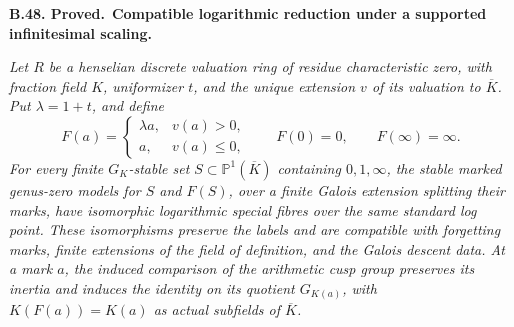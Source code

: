 \documentclass[11pt,a4paper]{article}
\newenvironment{claim}[3]{\par\medskip\noindent\hypertarget{#1}{\textbf{#1. #2.}}\ \textbf{#3.}\par\nopagebreak\smallskip\begingroup\itshape}{\endgroup\par\smallskip}
\begin{document}
\begin{claim}{B.48}{Proved}{Compatible logarithmic reduction under a supported infinitesimal scaling}
Let \(R\) be a henselian discrete valuation ring of residue
characteristic zero, with fraction field \(K\), uniformizer \(t\),
and the unique extension \(v\) of its valuation to \(\overline K\).
Put \(\lambda=1+t\), and define
\[
 F(a)=
 \begin{cases}
   \lambda a,&v(a)>0,\\
   a,&v(a)\leq0,
 \end{cases}
 \qquad F(0)=0,
 \qquad F(\infty)=\infty.                                \tag{B.CF.12}
\]
For every finite \(G_K\)-stable set \(S\subset\mathbb P^1(\overline K)\)
containing \(0,1,\infty\), the stable marked genus-zero models for
\(S\) and \(F(S)\), over a finite Galois extension splitting their
marks, have isomorphic logarithmic special fibres over the same
standard log point. These isomorphisms preserve the labels and are
compatible with forgetting marks, finite extensions of the field of
definition, and the Galois descent data. At a mark \(a\), the induced
comparison of the arithmetic cusp group preserves its inertia and
induces the identity on its quotient \(G_{K(a)}\), with
\(K(F(a))=K(a)\) as actual subfields of \(\overline K\).
\end{claim}
\end{document}
